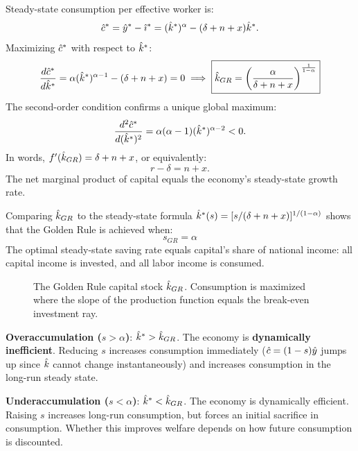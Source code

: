 \documentclass[11pt]{article}
\begin{document}
Steady-state consumption per effective worker is:
\[
\hat{c}^* = \hat{y}^* - \hat{\imath}^* = (\hat{k}^*)^\alpha - (\delta+n+x)\hat{k}^*.
\]
Maximizing $\hat{c}^*$ with respect to $\hat{k}^*$:
\[
\frac{d\hat{c}^*}{d\hat{k}^*} = \alpha(\hat{k}^*)^{\alpha-1} - (\delta+n+x) = 0 \implies \boxed{\hat{k}_{GR} = \left(\frac{\alpha}{\delta+n+x}\right)^{\frac{1}{1-\alpha}}}
\]
The second-order condition confirms a unique global maximum:
\[
\frac{d^2\hat{c}^*}{d(\hat{k}^*)^2} = \alpha(\alpha-1)(\hat{k}^*)^{\alpha-2} < 0.
\]
In words, $f'(\hat{k}_{GR}) = \delta + n + x$, or equivalently:
\[
r - \delta = n + x.
\]
The net marginal product of capital equals the economy's steady-state growth rate.

Comparing $\hat{k}_{GR}$ to the steady-state formula $\hat{k}^*(s) = [s / (\delta+n+x)]^{1/(1-\alpha)}$ shows that the Golden Rule is achieved when:
\[
\boxed{s_{GR} = \alpha}
\]
The optimal steady-state saving rate equals capital's share of national income: all capital income is invested, and all labor income is consumed.

\begin{figure}[ht]
\centering
{}
\caption{The Golden Rule capital stock $\hat{k}_{GR}$. Consumption is maximized where the slope of the production function equals the break-even investment ray.}
\end{figure}

\begin{flatlist}
  \item \textbf{Overaccumulation ($s > \alpha$)}: $\hat{k}^* > \hat{k}_{GR}$. The economy is \textbf{dynamically inefficient}. Reducing $s$ increases consumption immediately ($\hat{c} = (1-s)\hat{y}$ jumps up since $\hat{k}$ cannot change instantaneously) and increases consumption in the long-run steady state.
  \item \textbf{Underaccumulation ($s < \alpha$)}: $\hat{k}^* < \hat{k}_{GR}$. The economy is dynamically efficient. Raising $s$ increases long-run consumption, but forces an initial sacrifice in consumption. Whether this improves welfare depends on how future consumption is discounted.
\end{flatlist}
\end{document}
